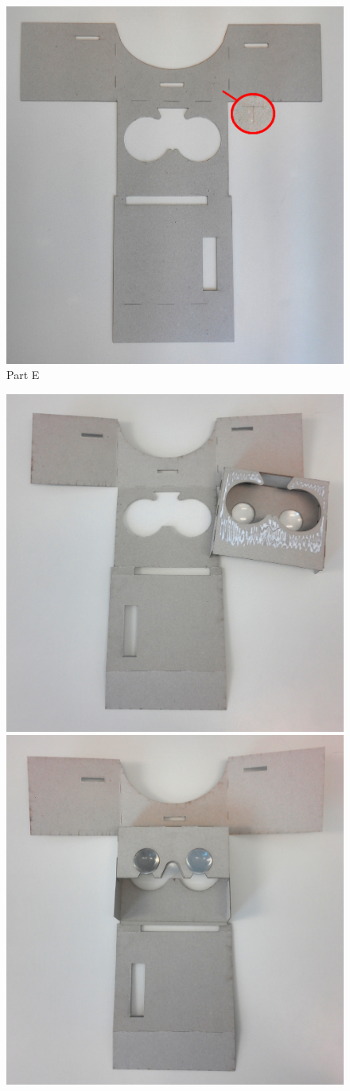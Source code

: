 \documentclass[../../Cardboard_Assembling]{subfiles}
\begin{document}
\begin{enumerate}
	\begin{figure}[htb]
		\centering
		\includegraphics[width=0.75\linewidth]{partE01}
		\caption{Part E}
		\label{fig:screenshot017}
	\end{figure}
	\begin{figure}[htb]
		\centering
		\includegraphics[width=0.475\linewidth]{partE02}
		\includegraphics[width=0.46\linewidth]{partE03}

\end{figure}
\end{enumerate}
\end{document}
